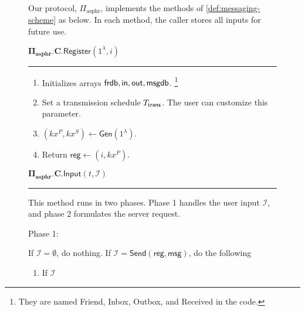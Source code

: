 \documentclass[sigconf, nonacm, balance=false, natbib=false, screen]{acmart}
\newcommand{\gen}{\mathsf{Gen}}
\newcommand{\msg}{\mathsf{msg}}
\newcommand{\reg}{\mathsf{reg}}
\newcommand{\cI}{\mathcal{I}}
\newcommand{\asphr}{\text{asphr}}
\newcommand{\send}{\mathsf{Send}}
\begin{document}
\begin{figure}[h!]
\begin{framed}
\begin{definition}
Our protocol, $\Pi_{\asphr}$, implements the methods of \cref{def:messaging-scheme} as below. In each method, the caller stores all inputs for future use.
\vspace{10pt}

$\mathbf{\Pi_{\asphr}.C.\mathsf{Register}}(1^{\lambda}, i)$
\vspace{5pt}
\hrule
\vspace{5pt}
\begin{enumerate}
    \item Initializes arrays $\mathsf{frdb}, \mathsf{in}, \mathsf{out}, \mathsf{msgdb}$. \footnote{They are named Friend, Inbox, Outbox, and Received in the code.}
    \item Set a transmission schedule $T_{\mathsf{trans}}$. The user can customize this parameter.
    \item $(kx^P, kx^S) \leftarrow \gen(1^{\lambda})$. 
    \item Return $\reg \leftarrow (i, kx^P)$.
\end{enumerate}

$\mathbf{\Pi_{\asphr}.C.\mathsf{Input}}(t, \cI)$
\vspace{5pt}
\hrule
\vspace{5pt}
This method runs in two phases. Phase 1 handles the user input $\cI$, and phase 2 formulates the server request.

Phase 1: 

If $\cI = \emptyset$, do nothing. If $\cI = \send(\reg, \msg)$, do the following

\begin{enumerate}
    \item If $\cI$
\end{enumerate}
\end{definition}
\end{framed}
\end{figure}
\end{document}
